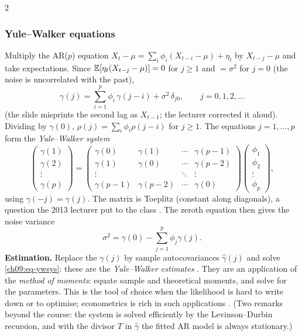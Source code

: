 \begin{paracol}{2}
\subsubsection{Yule--Walker equations}\label{ch09:sec-yw}
Multiply the AR($p$) equation $X_t-\mu=\sum_i\phi_i(X_{t-i}-\mu)+\eta_t$ by $X_{t-j}-\mu$ and take expectations. Since
$\mathbb{E}[\eta_t(X_{t-j}-\mu)]=0$ for $j\ge1$ and $=\sigma^2$ for $j=0$ (the noise is uncorrelated with the past),
\begin{equation}\label{ch09:eq-yw}
  \gamma(j)=\sum_{i=1}^p\phi_i\,\gamma(j-i)+\sigma^2\,\delta_{j0},\qquad j=0,1,2,\dots
\end{equation}
 (the slide misprints the second lag as $X_{t-1}$; the
lecturer corrected it aloud). Dividing by $\gamma(0)$, $\rho(j)=\sum_i\phi_i\rho(j-i)$ for $j\ge1$. The equations
$j=1,\dots,p$ form the \emph{Yule--Walker system}
\begin{equation}\label{ch09:eq-ywsys}
  \begin{pmatrix}\gamma(1)\\ \gamma(2)\\ \vdots\\ \gamma(p)\end{pmatrix}=
  \begin{pmatrix}\gamma(0)&\gamma(1)&\cdots&\gamma(p-1)\\ \gamma(1)&\gamma(0)&\cdots&\gamma(p-2)\\
  \vdots&&\ddots&\vdots\\ \gamma(p-1)&\gamma(p-2)&\cdots&\gamma(0)\end{pmatrix}
  \begin{pmatrix}\phi_1\\ \phi_2\\ \vdots\\ \phi_p\end{pmatrix},
\end{equation}
using $\gamma(-j)=\gamma(j)$. The matrix is Toeplitz (constant along diagonals), a question the 2013 lecturer put to the
class . The zeroth equation then gives the noise variance
\begin{equation}\label{ch09:eq-ywsigma}
  \sigma^2=\gamma(0)-\sum_{j=1}^p\phi_j\gamma(j).
\end{equation}
\textbf{Estimation.} Replace the $\gamma(j)$ by sample autocovariances $\hat\gamma(j)$ and solve
\eqref{ch09:eq-ywsys}: these are the \emph{Yule--Walker estimates} . They are an application of the
\emph{method of moments}: equate sample and theoretical moments, and solve for the parameters. This is the tool of choice when the likelihood is hard to write
down or to optimise; econometrics is rich in such applications . (Two remarks beyond
the course: the system is solved efficiently by the Levinson--Durbin recursion, and with the divisor $T$ in $\hat\gamma$ the
fitted AR model is always stationary.)


\end{paracol}
